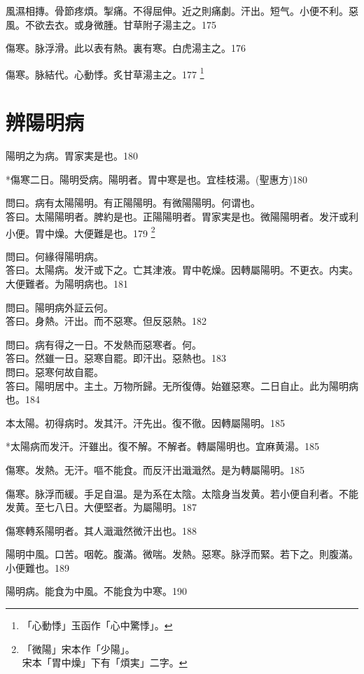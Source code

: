 風濕相摶。骨節疼煩。掣痛。不得屈伸。近之則痛劇。汗出。短气。小便不利。惡風。不欲去衣。或身微腫。甘草附子湯主之。175

傷寒。脉浮滑。此以表有熱。裏有寒。白虎湯主之。176

傷寒。脉結代。心動悸。炙甘草湯主之。177
	\footnote{「心動悸」玉函作「心中驚悸」。}

\chapter{辨陽明病}

陽明之为病。胃家実是也。180

*傷寒二日。陽明受病。陽明者。胃中寒是也。宜桂枝湯。(聖惠方)180

問曰。病有太陽陽明。有正陽陽明。有微陽陽明。何谓也。\\
答曰。太陽陽明者。脾約是也。正陽陽明者。胃家実是也。微陽陽明者。发汗或利小便。胃中燥。大便難是也。179
	\footnote{「微陽」宋本作「少陽」。\\宋本「胃中燥」下有「煩実」二字。}

問曰。何緣得陽明病。\\
答曰。太陽病。发汗或下之。亡其津液。胃中乾燥。因轉屬陽明。不更衣。内実。大便難者。为陽明病也。181

問曰。陽明病外証云何。\\
答曰。身熱。汗出。而不惡寒。{\khaaitp 但}反惡熱。182

問曰。病有得之一日。不发熱而惡寒者。何。\\
答曰。然雖一日。惡寒自罷。即汗出。惡熱也。183\\
問曰。惡寒何故自罷。\\
答曰。陽明居中。主土。万物所歸。无所復傳。始雖惡寒。二日自止。此为陽明病也。184

本太陽。初得病时。发其汗。汗先出{\khaaitp 。復}不徹。因轉屬陽明。185

*太陽病而发汗。汗雖出。復不解。不解者。轉屬陽明也。宜麻黄湯。{\gaoben}185

傷寒。发熱。无汗。嘔不能食。而反汗出濈濈然。是为轉屬陽明。185

傷寒。脉浮而緩。手足自温。是为系在太陰。太陰{\khaaitp 身}当发黄。若小便自利者。不能发黄。至七八日。大便堅者。为屬陽明。187

傷寒轉系陽明者。其人濈濈然微汗出也。188

陽明中風。口苦。咽乾。腹滿。微喘。发熱。惡寒。脉浮而緊。若下之。則腹滿。小便難也。189

陽明病。能食为中風。不能食为中寒。190

